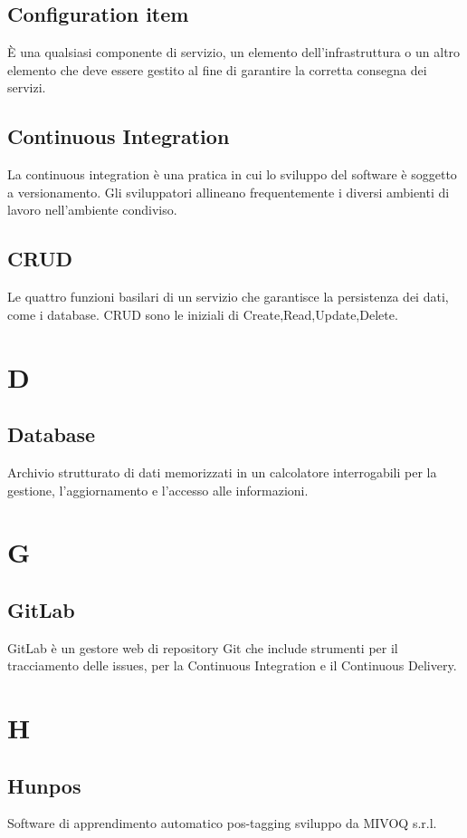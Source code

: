{	\subsection{Configuration item}
	\`E una qualsiasi componente di servizio, un elemento dell'infrastruttura o un altro elemento che deve essere gestito al fine di garantire la corretta consegna dei servizi.
	
	
	\subsection{Continuous Integration}
	La continuous integration è una pratica in cui lo sviluppo del software è soggetto a versionamento. Gli sviluppatori allineano frequentemente i diversi ambienti di lavoro nell'ambiente condiviso.
	
	\subsection{CRUD}
	Le quattro funzioni basilari di un servizio che garantisce la persistenza dei dati, come i database. CRUD sono le iniziali di Create,Read,Update,Delete.
	
	\section{D}
	\subsection{Database}
	Archivio strutturato di dati memorizzati in un calcolatore interrogabili per la gestione, l'aggiornamento e l'accesso alle informazioni.
	
	\section{G}
	\subsection{GitLab} 
	GitLab è un gestore web di repository Git che include strumenti per il tracciamento delle issues, per la Continuous Integration e il Continuous Delivery.
	
	\section{H}
	\subsection{Hunpos}
	Software di apprendimento automatico pos-tagging sviluppo da MIVOQ s.r.l.
	
}
